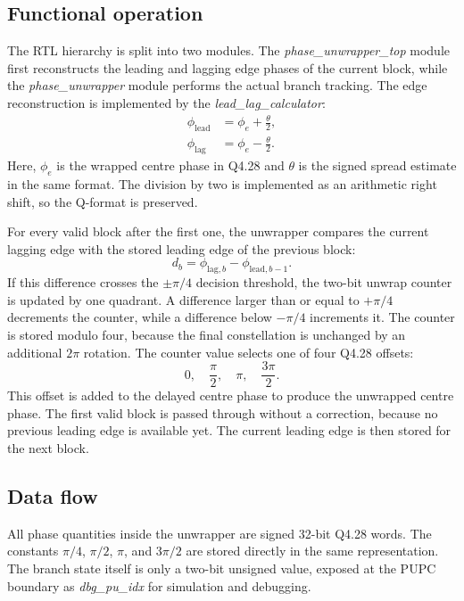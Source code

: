 \subsection{Functional operation}

The RTL hierarchy is split into two modules. The \textit{phase\_unwrapper\_top} module first reconstructs the leading and lagging edge phases of the current block, while the \textit{phase\_unwrapper} module performs the actual branch tracking. The edge reconstruction is implemented by the \textit{lead\_lag\_calculator}:
\begin{align}
    \phi_{\mathrm{lead}} &= \phi_e + \frac{\theta}{2},\\
    \phi_{\mathrm{lag}}  &= \phi_e - \frac{\theta}{2}.
\end{align}
Here, \(\phi_e\) is the wrapped centre phase in Q4.28 and \(\theta\) is the signed spread estimate in the same format. The division by two is implemented as an arithmetic right shift, so the Q-format is preserved.

For every valid block after the first one, the unwrapper compares the current lagging edge with the stored leading edge of the previous block:
\begin{equation}
    d_b = \phi_{\mathrm{lag},b} - \phi_{\mathrm{lead},b-1}.
\end{equation}
If this difference crosses the \(\pm \pi/4\) decision threshold, the two-bit unwrap counter is updated by one quadrant. A difference larger than or equal to \(+\pi/4\) decrements the counter, while a difference below \(-\pi/4\) increments it. The counter is stored modulo four, because the final constellation is unchanged by an additional \(2\pi\) rotation. The counter value selects one of four Q4.28 offsets:
\[
    0,\quad \frac{\pi}{2},\quad \pi,\quad \frac{3\pi}{2}.
\]
This offset is added to the delayed centre phase to produce the unwrapped centre phase. The first valid block is passed through without a correction, because no previous leading edge is available yet. The current leading edge is then stored for the next block.

\subsection{Data flow}

All phase quantities inside the unwrapper are signed 32-bit Q4.28 words. The constants \(\pi/4\), \(\pi/2\), \(\pi\), and \(3\pi/2\) are stored directly in the same representation. The branch state itself is only a two-bit unsigned value, exposed at the PUPC boundary as \textit{dbg\_pu\_idx} for simulation and debugging.

